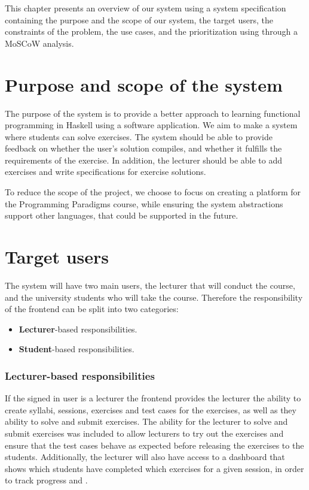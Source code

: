 This chapter presents an overview of our system using a system specification containing the purpose and the scope of our system, the target users, the constraints of the problem, the use cases, and the prioritization using through a MoSCoW analysis.

\section*{Purpose and scope of the system }
The purpose of the system is to provide a better approach to learning functional programming in Haskell using a software application.
We aim to make a system where students can solve exercises. The system should be able to provide feedback on whether the user's solution compiles, and whether it fulfills the requirements of the exercise. 
In addition, the lecturer should be able to add exercises and write specifications for exercise solutions.

To reduce the scope of the project, we choose to focus on creating a platform for the Programming Paradigms course, while ensuring the system abstractions support other languages, that could be supported in the future.

\section*{Target users}
The system will have two main users, the lecturer that will conduct the course, and the university students who will take the course.
Therefore the responsibility of the frontend can be split into two categories: 
\begin{itemize}
    \item \textbf{Lecturer}-based responsibilities.
    \item \textbf{Student}-based responsibilities.
\end{itemize}

\subsubsection*{Lecturer-based responsibilities}
If the signed in user is a lecturer the frontend provides the lecturer the ability to create syllabi, sessions, exercises and test cases for the exercises, as well as they ability to solve and submit exercises. The ability for the lecturer to solve and submit exercises was included to allow lecturers to try out the exercises and ensure that the test cases behave as expected before releasing the exercises to the students. Additionally, the lecturer will also have access to a dashboard that shows which students have completed which exercises for a given session, in order to track progress and .


